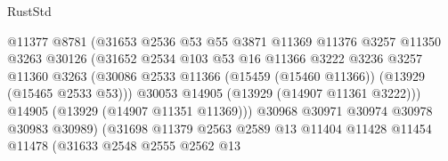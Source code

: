 \begin{lexlean}{RustStd}
\begin{coremodule}
                                      @11377
                                      @8781
                                      (@31653
                                        @2536
                                        @53
                                        @55
                                        @3871
                                        @11369
                                        @11376
                                        @3257
                                        @11350
                                        @3263
                                        @30126
                                        (@31652
                                          @2534
                                          @103
                                          @53
                                          @16
                                          @11366
                                          @3222
                                          @3236
                                          @3257
                                          @11360
                                          @3263
                                          (@30086
                                            @2533
                                            @11366
                                            (@15459 (@15460 @11366))
                                            (@13929 (@15465 @2533 @53)))
                                          @30053
                                          @14905
                                          (@13929 (@14907 @11361 @3222)))
                                        @14905
                                        (@13929 (@14907 @11351 @11369)))
                                      @30968
                                      @30971
                                      @30974
                                      @30978
                                      @30983
                                      @30989)
                                    (@31698
                                      @11379
                                      @2563
                                      @2589
                                      @13
                                      @11404
                                      @11428
                                      @11454
                                      @11478
                                      (@31633
                                        @2548
                                        @2555
                                        @2562
                                        @13

\end{coremodule}
\end{lexlean}
